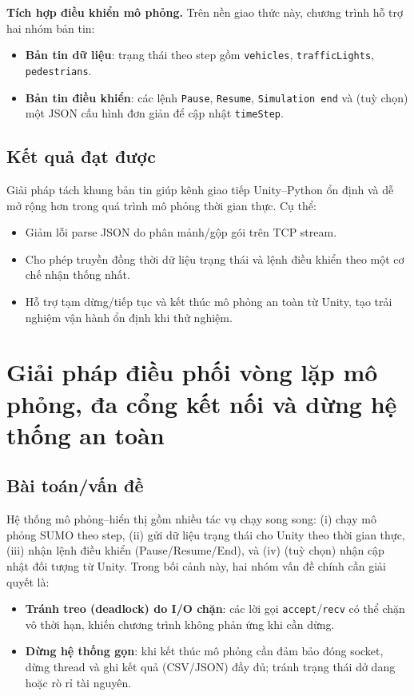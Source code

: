 \documentclass[../DoAn.tex]{subfiles}
\begin{document}
\textbf{Tích hợp điều khiển mô phỏng.} Trên nền giao thức này, chương trình hỗ trợ hai nhóm bản tin:
\begin{itemize}[leftmargin=2em]
	\item \textbf{Bản tin dữ liệu}: trạng thái theo step gồm \texttt{vehicles}, \texttt{trafficLights}, \texttt{pedestrians}.
	\item \textbf{Bản tin điều khiển}: các lệnh \texttt{Pause}, \texttt{Resume}, \texttt{Simulation end} và (tuỳ chọn) một JSON cấu hình đơn giản để cập nhật \texttt{timeStep}.
\end{itemize}

\subsection{Kết quả đạt được}
Giải pháp tách khung bản tin giúp kênh giao tiếp Unity--Python ổn định và dễ mở rộng hơn trong quá trình mô phỏng thời gian thực. Cụ thể:
\begin{itemize}[leftmargin=2em]
	\item Giảm lỗi parse JSON do phân mảnh/gộp gói trên TCP stream.
	\item Cho phép truyền đồng thời dữ liệu trạng thái và lệnh điều khiển theo một cơ chế nhận thống nhất.
	\item Hỗ trợ tạm dừng/tiếp tục và kết thúc mô phỏng an toàn từ Unity, tạo trải nghiệm vận hành ổn định khi thử nghiệm.
\end{itemize}

\section{Giải pháp điều phối vòng lặp mô phỏng, đa cổng kết nối và dừng hệ thống an toàn}
\subsection{Bài toán/vấn đề}
Hệ thống mô phỏng--hiển thị gồm nhiều tác vụ chạy song song: (i) chạy mô phỏng SUMO theo step, (ii) gửi dữ liệu trạng thái cho Unity theo thời gian thực, (iii) nhận lệnh điều khiển (Pause/Resume/End), và (iv) (tuỳ chọn) nhận cập nhật đối tượng từ Unity. Trong bối cảnh này, hai nhóm vấn đề chính cần giải quyết là:
\begin{itemize}[leftmargin=2em]
	\item \textbf{Tránh treo (deadlock) do I/O chặn}: các lời gọi \texttt{accept}/\texttt{recv} có thể chặn vô thời hạn, khiến chương trình không phản ứng khi cần dừng.
	\item \textbf{Dừng hệ thống gọn}: khi kết thúc mô phỏng cần đảm bảo đóng socket, dừng thread và ghi kết quả (CSV/JSON) đầy đủ; tránh trạng thái dở dang hoặc rò rỉ tài nguyên.
\end{itemize}
\end{document}
